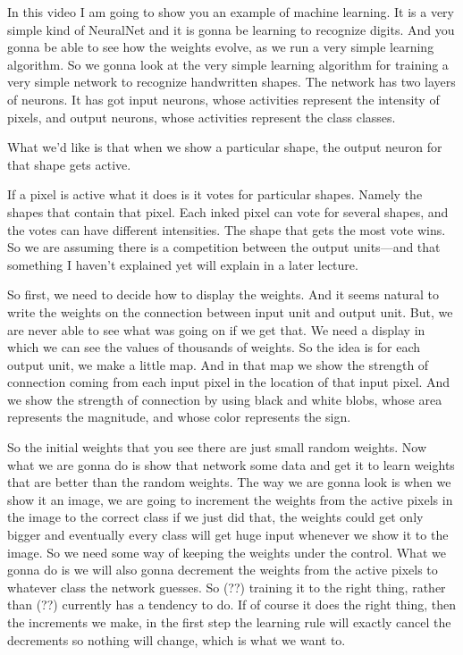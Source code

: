 \begin{multicols}{2}
\begin{footnotesize}
In this video I am going to show you an example of machine learning. It is a very simple kind of NeuralNet and it is gonna be learning to recognize digits. And you gonna be able to see how the weights evolve, as we run a very simple learning algorithm. So we gonna look at the very simple learning algorithm for training a very simple network to recognize handwritten shapes. The network has two layers of neurons. It has got input neurons, whose activities represent the intensity of pixels, and output neurons, whose activities represent the class classes. 

What we'd like is that when we show a particular shape, the output neuron for that shape gets active. 

If a pixel is active what it does is it votes for particular shapes. Namely the shapes that contain that pixel. Each inked pixel can vote for several shapes, and the votes can have different intensities. The shape that gets the most vote wins. So we are assuming there is a competition between the output units---and that something I haven't explained yet will explain in a later lecture. 

So first, we need to decide how to display the weights. And it seems natural to write the weights on the connection between input unit and output unit. But, we are never able to see what was going on if we get that. We need a display in which we can see the values of thousands of weights. So the idea is for each output unit, we make a little map. And in that map we show the strength of connection coming from each input pixel in the location of that input pixel. And we show the strength of connection by using black and white blobs, whose area represents the magnitude, and whose color represents the sign.

So the initial weights that you see there are just small random weights. Now what we are gonna do is show that network some data and get it to learn weights that are better than the random weights. The way we are gonna look is when we show it an image, we are going to increment the weights from the active pixels in the image to the correct class if we just did that, the weights could get only bigger and eventually every class will get huge input whenever we show it to the image. So we need some way of keeping the weights under the control. What we gonna do is we will also gonna decrement the weights from the active pixels to whatever class the network guesses. So (??) training it to the right thing, rather than (??) currently has a tendency to do. If of course it does the right thing, then the increments we make, in the first step the learning rule will exactly cancel the decrements so nothing will change, which is what we want to. 


\end{footnotesize}
\end{multicols}
